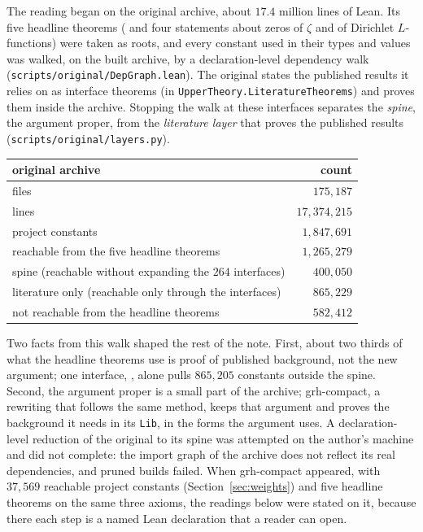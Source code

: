 \documentclass[11pt]{article}
\theoremstyle{definition}
\theoremstyle{remark}
\begin{document}
The reading began on the original archive, about $17.4$ million lines of Lean. Its five headline
theorems ( and four statements about zeros of $\zeta$ and of Dirichlet
$L$-functions) were taken as roots, and every constant used in their types and values was walked,
on the built archive, by a declaration-level dependency walk
(\texttt{scripts/original/DepGraph.lean}). The original states the published results it relies on
as interface theorems (in \texttt{UpperTheory.LiteratureTheorems}) and proves them inside the
archive. Stopping the walk at these interfaces separates the \emph{spine}, the argument proper, from
the \emph{literature layer} that proves the published results
(\texttt{scripts/original/layers.py}).

\begin{center}
\begin{tabular}{lr}
\toprule
original archive & count\\
\midrule
files & $175{,}187$\\
lines & $17{,}374{,}215$\\
project constants & $1{,}847{,}691$\\
reachable from the five headline theorems & $1{,}265{,}279$\\
\quad spine (reachable without expanding the $264$ interfaces) & $400{,}050$\\
\quad literature only (reachable only through the interfaces) & $865{,}229$\\
not reachable from the headline theorems & $582{,}412$\\
\bottomrule
\end{tabular}
\end{center}

Two facts from this walk shaped the rest of the note. First, about two thirds of what the headline
theorems use is proof of published background, not the new argument; one interface,
, alone pulls $865{,}205$ constants outside the spine.
Second, the argument proper is a small part of the archive; grh-compact, a rewriting that
follows the same method, keeps that argument and proves the background it needs in its
\texttt{Lib}, in the forms the argument uses. A declaration-level reduction of the original to its spine was attempted on
the author's machine and did not complete: the import graph of the archive does not reflect its
real dependencies, and pruned builds failed. When grh-compact appeared, with $37{,}569$ reachable
project constants (Section~\ref{sec:weights}) and five headline theorems on the same three
axioms, the readings below were stated on it, because there each step is a named Lean declaration
that a reader can open.
\end{document}

